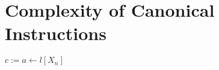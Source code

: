 \documentclass[11pt]{article}
\begin{document}











\section{Complexity of Canonical Instructions}
\begin{center}
$
c := a \leftarrow l[X_n]
$
\end{center}
\end{document}
